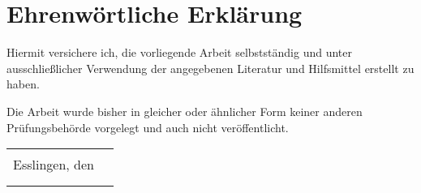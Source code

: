 
\chapter*{Ehrenwörtliche Erklärung}

Hiermit versichere ich, die vorliegende Arbeit selbstständig und unter ausschließlicher Verwendung der angegebenen Literatur und Hilfsmittel erstellt zu haben.

Die Arbeit wurde bisher in gleicher oder ähnlicher Form keiner anderen Prüfungsbehörde vorgelegt und auch nicht veröffentlicht.

\vspace*{5em}
\begin{tabular}[H]{ll}
	Esslingen, den \date & \rule{7cm}{0.4pt} \\
	& \seauthor
\end{tabular}